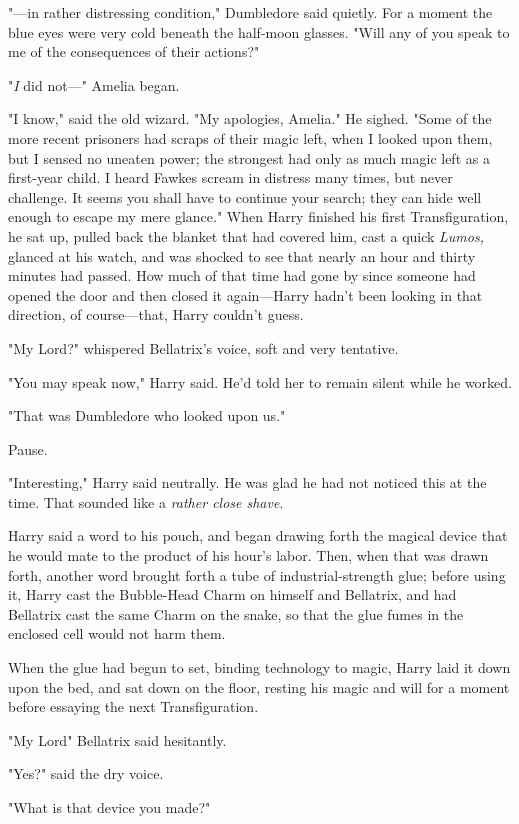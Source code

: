 "---in rather distressing condition," Dumbledore said quietly. For a moment the
blue eyes were very cold beneath the half-moon glasses. "Will any of you speak
to me of the consequences of their actions?"

"\emph{I} did not\mbox{---}" Amelia began.

"I know," said the old wizard. "My apologies, Amelia." He sighed. "Some of the
more recent prisoners had scraps of their magic left, when I looked upon them,
but I sensed no uneaten power; the strongest had only as much magic left as a
first-year child. I heard Fawkes scream in distress many times, but never
challenge. It seems you shall have to continue your search; they can hide well
enough to escape my mere glance."
\sbreak
When Harry finished his first Transfiguration, he sat up, pulled back the
blanket that had covered him, cast a quick \emph{Lumos,} glanced at his watch,
and was shocked to see that nearly an hour and thirty minutes had passed. How
much of that time had gone by since someone had opened the door and then closed
it again---Harry hadn't been looking in that direction, of course---that, Harry
couldn't guess.

"My Lord\el?" whispered Bellatrix's voice, soft and very tentative.

"You may speak now," Harry said. He'd told her to remain silent while he worked.

"That was Dumbledore who looked upon us."

Pause.

"Interesting," Harry said neutrally. He was glad he had not noticed this at the
time. That sounded like a \emph{rather close shave}.

Harry said a word to his pouch, and began drawing forth the magical device that
he would mate to the product of his hour's labor. Then, when that was drawn
forth, another word brought forth a tube of industrial-strength glue; before
using it, Harry cast the Bubble-Head Charm on himself and Bellatrix, and had
Bellatrix cast the same Charm on the snake, so that the glue fumes in the
enclosed cell would not harm them.

When the glue had begun to set, binding technology to magic, Harry laid it down
upon the bed, and sat down on the floor, resting his magic and will for a
moment before essaying the next Transfiguration.

"My Lord{\el}" Bellatrix said hesitantly.

"Yes?" said the dry voice.

"What is that device you made?"

